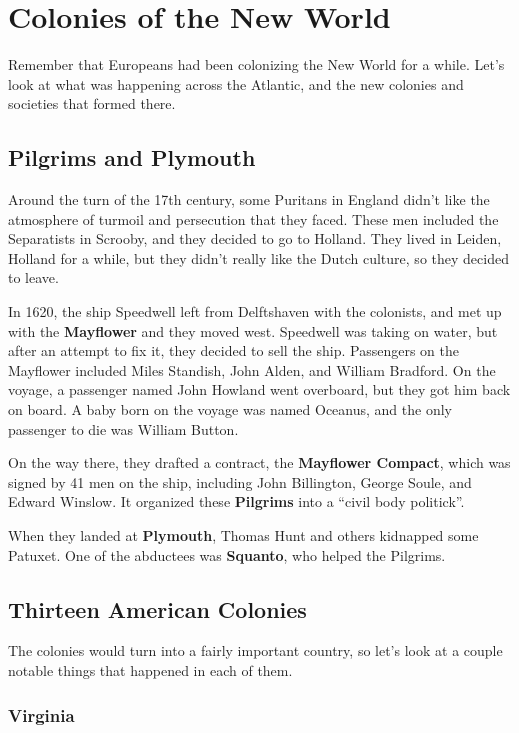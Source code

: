 \chapter{Colonies of the New World}

Remember that Europeans had been colonizing the New World for a while.
Let's look at what was happening across the Atlantic,
and the new colonies and societies that formed there.

\section{Pilgrims and Plymouth}

Around the turn of the 17th century,
some Puritans in England didn't like the atmosphere of turmoil and persecution that they faced.
These men included the Separatists in Scrooby, and they decided to go to Holland.
They lived in Leiden, Holland for a while, but they didn't really like the Dutch culture,
so they decided to leave.

In 1620, the ship Speedwell left from Delftshaven with the colonists,
and met up with the \textbf{Mayflower} and they moved west.
Speedwell was taking on water, but after an attempt to fix it, they decided to sell the ship.
Passengers on the Mayflower included Miles Standish, John Alden, and William Bradford.
On the voyage, a passenger named John Howland went overboard, but they got him back on board.
A baby born on the voyage was named Oceanus, and the only passenger to die was William Button.

On the way there, they drafted a contract, the \textbf{Mayflower Compact},
which was signed by 41 men on the ship, including John Billington, George Soule, and Edward Winslow.
It organized these \textbf{Pilgrims} into a ``civil body politick''.

When they landed at \textbf{Plymouth}, Thomas Hunt and others kidnapped some Patuxet.
One of the abductees was \textbf{Squanto}, who helped the Pilgrims.

\section{Thirteen American Colonies}

The colonies would turn into a fairly important country,
so let's look at a couple notable things that happened in each of them.

\subsection*{Virginia}

